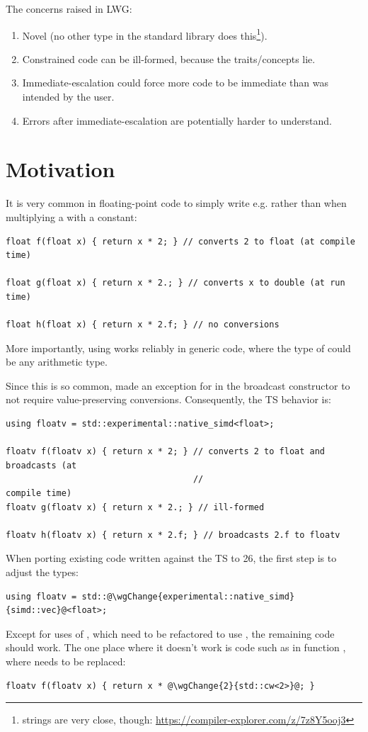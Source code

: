 The concerns raised in LWG:
\begin{enumerate}
  \item Novel (no other type in the standard library does this\footnote{ strings are
    very close, though: \url{https://compiler-explorer.com/z/7z8Y5ooj3}}).
  \item Constrained code can be ill-formed, because the traits/concepts lie.
  \item Immediate-escalation could force more code to be immediate than was intended by the user.
  \item Errors after immediate-escalation are potentially harder to understand.
\end{enumerate}

\section{Motivation}

It is very common in floating-point code to simply write e.g.  rather than 
when multiplying a  with a constant:
\medskip\begin{lstlisting}[style=Vc]
float f(float x) { return x * 2; } // converts 2 to float (at compile time)

float g(float x) { return x * 2.; } // converts x to double (at run time)

float h(float x) { return x * 2.f; } // no conversions
\end{lstlisting}

More importantly, using  works reliably in generic code, where the type of  could
be any arithmetic type.

Since this is so common,  made an exception for  in the
broadcast constructor to not require value-preserving conversions.
Consequently, the TS behavior is:
\medskip\begin{lstlisting}[style=Vc]
using floatv = std::experimental::native_simd<float>;

floatv f(floatv x) { return x * 2; } // converts 2 to float and broadcasts (at
                                     //                               compile time)
floatv g(floatv x) { return x * 2.; } // ill-formed

floatv h(floatv x) { return x * 2.f; } // broadcasts 2.f to floatv
\end{lstlisting}

When porting existing code written against the TS to \CC{}26, the first step is to adjust the types:
\medskip\begin{lstlisting}
using floatv = std::@\wgChange{experimental::native_simd}{simd::vec}@<float>;
\end{lstlisting}
Except for uses of , which need to be refactored to use
, the remaining code should work.
The one place where it doesn't work is code such as in function , where  needs to be
replaced:
\medskip\begin{lstlisting}[style=Vc]
floatv f(floatv x) { return x * @\wgChange{2}{std::cw<2>}@; }
\end{lstlisting}

